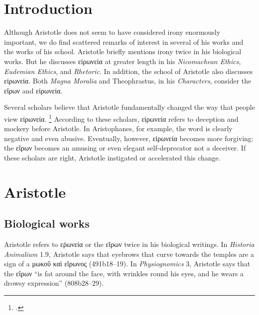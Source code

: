 \documentclass[12pt,letterpaper]{article}
\begin{document}

\pagestyle{notes}

\section*{Introduction}

Although Aristotle does not seem to have considered irony enormously important, we do find scattered remarks of interest in several of his works and the works of his school.
Aristotle briefly mentions irony twice in his biological works.
But he discusses \textgreek{εἰρωνεία} at greater length in his \textit{Nicomachean Ethics}, \textit{Eudemian Ethics}, and \textit{Rhetoric}.
In addition, the school of Aristotle also discusses \textgreek{εἰρωνεία}.
Both \textit{Magna Moralia} and Theophrastus, in his \textit{Characters}, consider the \textgreek{εἴρων} and \textgreek{εἰρωνεία}.

Several scholars believe that Aristotle fundamentally changed the way that people view \textgreek{εἰρωνεία}.%
\footcites[See, for example, ][]{ribbeck-begriff-eiron-1876}{gooch-socratic-irony-and-arisotles-eiron-1987}{lane-reconsidering-socratic-irony-2011}
According to these scholars, \textgreek{εἰρωνεία} refers to deception and mockery before Aristotle.
In Aristophanes, for example, the word is clearly negative and even abusive.
Eventually, however, \textgreek{εἰρωνεία} becomes more forgiving: the \textgreek{εἴρων} becomes an amusing or even elegant self-deprecator not a deceiver.
If these scholars are right, Aristotle instigated or accelerated this change.

\section*{Aristotle}

\subsection*{Biological works}

Aristotle refers to \textgreek{εῤωνεία} or the \textgreek{εἴρων} twice in his biological writings.
In \textit{Historia Animalium} 1.9, Aristotle says that eyebrows that curve towards the temples are a sign of a \textgreek{μωκοῦ καὶ εἴρωνος} (491b18--19).
In \textit{Physiognomics} 3, Aristotle says that the \textgreek{εἴρων} ``is fat around the face, with wrinkles round his eyes, and he wears a drowsy expression'' (808b28--29).
\end{document}

